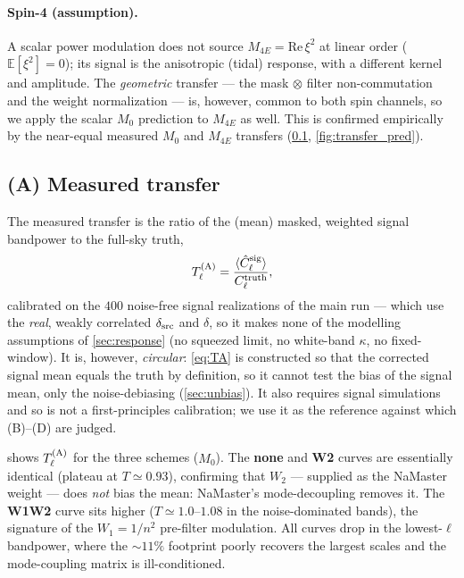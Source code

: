 \documentclass[11pt]{article}
\newcommand{\E}{\mathbb{E}}
\newcommand{\Wone}{W_1}
\newcommand{\Wtwo}{W_2}
\newcommand{\dt}{\delta}
\begin{document}
\paragraph{Spin-4 (assumption).}
A scalar power modulation does not source $M_{4E}=\mathrm{Re}\,\xi^2$ at linear
order ($\E[\xi^2]=0$); its signal is the anisotropic (tidal) response, with a
different kernel and amplitude. The \emph{geometric} transfer --- the
mask$\,\otimes\,$filter non-commutation and the weight normalization --- is,
however, common to both spin channels, so we apply the scalar $M_0$ prediction
to $M_{4E}$ as well. This is confirmed empirically by the near-equal measured
$M_0$ and $M_{4E}$ transfers (\cref{sec:TA}, \cref{fig:transfer_pred}).

\subsection{(A) Measured transfer}\label{sec:TA}

The measured transfer is the ratio of the (mean) masked, weighted signal
bandpower to the full-sky truth,
\begin{equation}
T^{\rm (A)}_\ell=\frac{\langle\hat C^{\rm sig}_\ell\rangle}{C^{\rm truth}_\ell},
\label{eq:TA}
\end{equation}
calibrated on the $400$ noise-free signal realizations of the main run --- which
use the \emph{real}, weakly correlated $\delta_{\rm src}$ and $\dt$, so it makes
none of the modelling assumptions of \cref{sec:response} (no squeezed limit, no
white-band $\kappa$, no fixed-window). It is, however, \emph{circular}:
\cref{eq:TA} is constructed so that the corrected signal mean equals the truth by
definition, so it cannot test the bias of the signal mean, only the
noise-debiasing (\cref{sec:unbias}). It also requires signal simulations and so
is not a first-principles calibration; we use it as the reference against which
(B)--(D) are judged.

 shows $T^{\rm (A)}_\ell$ for the three schemes ($M_0$). The
\textbf{none} and \textbf{W2} curves are essentially identical (plateau at
$T\simeq0.93$), confirming that $\Wtwo$ --- supplied as the NaMaster weight ---
does \emph{not} bias the mean: NaMaster's mode-decoupling removes it. The
\textbf{W1W2} curve sits higher ($T\simeq1.0$--$1.08$ in the noise-dominated
bands), the signature of the $\Wone=1/n^2$ pre-filter modulation. All curves
drop in the lowest-$\ell$ bandpower, where the $\sim11\%$ footprint poorly
recovers the largest scales and the mode-coupling matrix is ill-conditioned.
\end{document}
